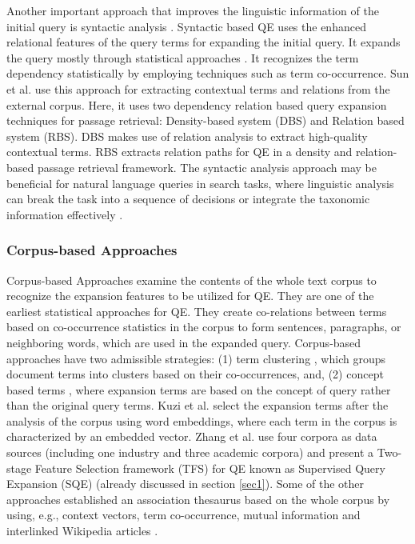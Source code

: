 Another important approach that improves the linguistic information of the initial query is syntactic analysis \cite{zhang2011syntactic}. Syntactic based QE uses the enhanced relational features of the query terms for expanding the initial query. It expands the query mostly through statistical approaches \cite{wu2011study}. It recognizes the term dependency statistically \cite{riezler2007statistical} by employing techniques such as term co-occurrence. Sun et al. \cite{sun2006mining} use this approach for extracting contextual terms and relations from the external corpus. Here, it uses two dependency relation based query
expansion techniques for passage retrieval: Density-based system (DBS) and  Relation based system (RBS). DBS makes use of relation analysis to extract high-quality contextual terms. RBS extracts relation paths for QE in a density and relation-based passage retrieval framework. The syntactic analysis approach may be beneficial for natural language queries in search tasks,  where linguistic analysis can break the task into a sequence of decisions \cite{zhang2011syntactic} or integrate the taxonomic information  effectively \cite{liu2008query}.

\subsubsection{Corpus-based Approaches}
Corpus-based Approaches examine the contents of the whole text corpus to recognize the expansion features to be utilized for QE. They are one of the earliest statistical approaches for QE. They create co-relations between terms based on co-occurrence statistics in the corpus to form sentences, paragraphs, or neighboring words, which are used in the expanded query. Corpus-based approaches have two admissible strategies: (1) term clustering \cite{jones1971automatic,minker1972evaluation,crouch1992experiments}, which groups document terms into clusters based on their co-occurrences, and, (2) concept based terms \cite{qiu1993concept,fonseca2005concept,natsev2007semantic}, where expansion terms are based on the concept of query rather than the original query terms. Kuzi et al. \cite{kuzi2016query} select the expansion terms after the analysis of the corpus using word embeddings, where each term in the corpus is characterized by an embedded vector. Zhang et al. \cite{zhang2016learning} use four corpora as data sources (including one industry and three academic corpora) and present a Two-stage Feature Selection framework (TFS) for QE known as Supervised Query Expansion (SQE) (already discussed in section \ref{sec1}). Some of the other approaches established an association thesaurus based on the whole corpus by using, e.g.,  context vectors\cite{gauch1999corpus}, term co-occurrence\cite{carpineto2001information},  mutual information \cite{hu2006improving} and interlinked Wikipedia articles \cite{milne2008learning}.

